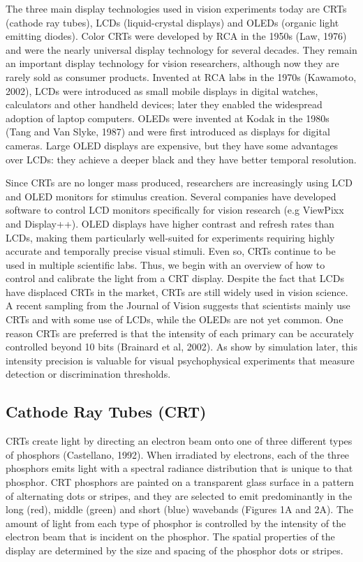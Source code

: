 \documentclass[
  letterpaper,
]{book}
\begin{document}
The three main display technologies used in vision experiments today are
CRTs (cathode ray tubes), LCDs (liquid-crystal displays) and OLEDs
(organic light emitting diodes). Color CRTs were developed by RCA in the
1950s (Law, 1976) and were the nearly universal display technology for
several decades. They remain an important display technology for vision
researchers, although now they are rarely sold as consumer products.
Invented at RCA labs in the 1970s (Kawamoto, 2002), LCDs were introduced
as small mobile displays in digital watches, calculators and other
handheld devices; later they enabled the widespread adoption of laptop
computers. OLEDs were invented at Kodak in the 1980s (Tang and Van
Slyke, 1987) and were first introduced as displays for digital cameras.
Large OLED displays are expensive, but they have some advantages over
LCDs: they achieve a deeper black and they have better temporal
resolution.

Since CRTs are no longer mass produced, researchers are increasingly
using LCD and OLED monitors for stimulus creation. Several companies
have developed software to control LCD monitors specifically for vision
research (e.g ViewPixx and Display++). OLED displays have higher
contrast and refresh rates than LCDs, making them particularly
well-suited for experiments requiring highly accurate and temporally
precise visual stimuli. Even so, CRTs continue to be used in multiple
scientific labs. Thus, we begin with an overview of how to control and
calibrate the light from a CRT display. Despite the fact that LCDs have
displaced CRTs in the market, CRTs are still widely used in vision
science. A recent sampling from the Journal of Vision suggests that
scientists mainly use CRTs and with some use of LCDs, while the OLEDs
are not yet common. One reason CRTs are preferred is that the intensity
of each primary can be accurately controlled beyond 10 bits (Brainard et
al, 2002). As show by simulation later, this intensity precision is
valuable for visual psychophysical experiments that measure detection or
discrimination thresholds.

\subsection{\texorpdfstring{\textbf{Cathode Ray Tubes
(CRT)}}{Cathode Ray Tubes (CRT)}}\label{cathode-ray-tubes-crt}

CRTs create light by directing an electron beam onto one of three
different types of phosphors (Castellano, 1992). When irradiated by
electrons, each of the three phosphors emits light with a spectral
radiance distribution that is unique to that phosphor. CRT phosphors are
painted on a transparent glass surface in a pattern of alternating dots
or stripes, and they are selected to emit predominantly in the long
(red), middle (green) and short (blue) wavebands (Figures 1A and 2A).
The amount of light from each type of phosphor is controlled by the
intensity of the electron beam that is incident on the phosphor. The
spatial properties of the display are determined by the size and spacing
of the phosphor dots or stripes.
\end{document}
